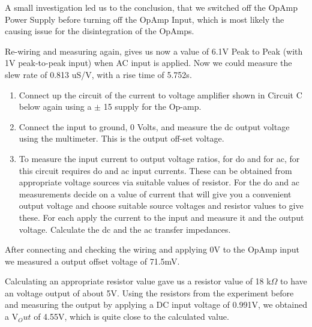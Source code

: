  A small investigation led us to the conclusion, that we switched off the OpAmp Power Supply before turning off the OpAmp Input, which is most likely the causing issue for the disintegration of the OpAmps.
 
 Re-wiring and measuring again, gives us now a value of 6.1V Peak to Peak (with 1V peak-to-peak input) when AC input is applied. 
 Now we could measure the slew rate of 0.813 uS/V, with a rise time of 5.752s.
 
 
 



\begin{enumerate}
	\item Connect up the circuit of the current to voltage amplifier shown in Circuit C below again using a $\pm$ 15 supply for the Op-amp.

	\item Connect the input to ground, 0 Volts, and measure the dc output voltage using the multimeter. This is the output off-set voltage.

	\item To measure the input current to output voltage ratios, for do and for ac, for this circuit
requires do and ac input currents. These can be obtained from appropriate voltage sources
via suitable values of resistor. For the do and ac measurements decide on a value of current
that will give you a convenient output voltage and choose suitable source voltages and
resistor values to give these. For each apply the current to the input and measure it and the
output voltage. Calculate the dc and the ac transfer impedances.

\end{enumerate}

%
After connecting and checking the wiring and applying 0V to the OpAmp input we measured a output offset voltage of 71.5mV.

Calculating an appropriate resistor value  gave us a resistor value of 18 k$\Omega$ to have an voltage output of about 5V.
Using the resistors from the experiment before and measuring the output by applying a DC input voltage of 0.991V, we obtained a V$_Out$ of 4.55V, which is quite close to the calculated value.

